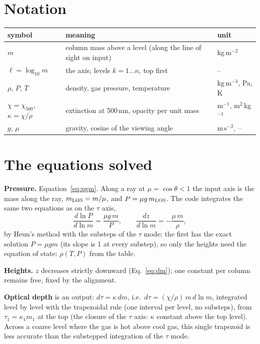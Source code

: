 \section{Notation}
\begin{tabularx}{\linewidth}{l Y l}
\toprule
symbol & meaning & unit \\ \midrule
$m$ & column mass above a level (along the line of sight on input) & kg\,m$^{-2}$ \\
$\ell=\log_{10}m$ & the axis; levels $k=1\dots n$, top first & -- \\
$\rho$, $P$, $T$ & density, gas pressure, temperature & kg\,m$^{-3}$, Pa, K \\
$\chi=\chi_{500}$, $\kappa=\chi/\rho$ & extinction at 500\,nm, opacity per unit mass & m$^{-1}$, m$^2$\,kg$^{-1}$ \\
$g$, $\mu$ & gravity, cosine of the viewing angle & m\,s$^{-2}$, -- \\
\bottomrule
\end{tabularx}



\section{The equations solved}
\textbf{Pressure.} Equation~\eqref{eq:pgm}. Along a ray at $\mu=\cos\theta<1$ the input axis is the mass along the ray,
$m_{\rm LOS}=m/\mu$, and $P=\mu g\,m_{\rm LOS}$. The code integrates the same two equations as on the $\tau$ axis,
\begin{equation}
\frac{d\ln P}{d\ln m}=\frac{\mu g\,m}{P},\qquad \frac{dz}{d\ln m}=-\frac{\mu\,m}{\rho},
\end{equation}
by Heun's method with the substeps of the $\tau$ mode; the first has the exact solution $P=\mu gm$ (its slope is 1 at every
substep), so only the heights need the equation of state: $\rho(T,P)$ from the table.

\textbf{Heights.} $z$ decreases strictly downward (Eq.~\ref{eq:dm}); one constant per column remains free, fixed by the alignment.

\textbf{Optical depth} is an output: $d\tau=\kappa\,dm$, i.e.\ $d\tau=(\chi/\rho)\,m\,d\ln m$, integrated level by level with the
trapezoidal rule (one interval per level, no substeps), from $\tau_1=\kappa_1m_1$ at the top (the closure of the $\tau$ axis:
$\kappa$ constant above the top level). Across a coarse level where the gas is hot above cool gas, this single trapezoid is less
accurate than the substepped integration of the $\tau$ mode.

